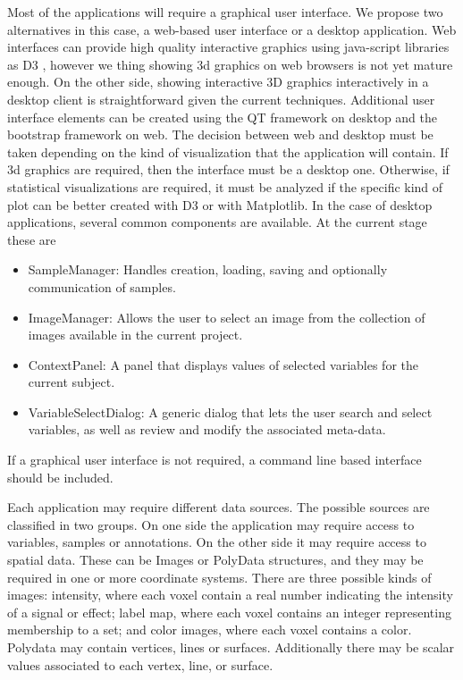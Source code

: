 Most of the applications will require a graphical user interface. We propose two alternatives in this case, a web-based user interface or a desktop application. Web interfaces can provide high quality interactive graphics using java-script libraries as D3 \autocite{bostock_d3_2011}, however we thing showing 3d graphics on web browsers is not yet mature enough. On the other side, showing interactive 3D graphics interactively in a desktop client  is straightforward given the current techniques. Additional user interface elements can be created using the QT framework on desktop and the bootstrap framework on web. The decision between web and desktop must be taken depending on the kind of visualization that the application will contain. If 3d graphics are required, then the interface must be a desktop one. Otherwise, if statistical visualizations are required, it must be analyzed if the specific kind of plot can be better created with D3 or with Matplotlib. In the case of desktop applications, several common components are available. At the current stage these are

\begin{itemize}
\item SampleManager: Handles creation, loading, saving and optionally communication of samples.
\item ImageManager: Allows the user to select an image from the collection of images available in the current project.
\item ContextPanel: A panel that displays values of selected variables for the current subject.
\item VariableSelectDialog: A generic dialog that lets the user search and select variables, as well as review and modify the associated meta-data.
\end{itemize}
If a graphical user interface is not required, a command line based interface should be included. 

Each application may require different data sources. The possible sources are classified in two groups. On one side the application may require access to variables, samples or annotations. On the other side it may require access to spatial data. These can be Images or PolyData structures, and they may be required in one or more coordinate systems. There are three possible kinds of images: intensity, where each voxel contain a real number indicating the intensity of a signal or effect; label map, where each voxel contains an integer representing membership to a set; and color images, where each voxel contains a color. Polydata may contain vertices, lines or surfaces. Additionally there may be scalar values associated to each vertex, line, or surface. 

